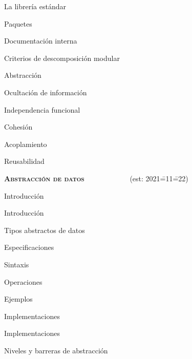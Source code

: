 \begin{longenum}
\begin{longenum}
\begin{longenum}
            \item La librería estándar
            \item Paquetes \opcional\
            \item Documentación interna \opcional\
        \end{longenum}
        \item Criterios de descomposición modular
        \begin{longenum}
            \item Abstracción
            \item Ocultación de información
            \item Independencia funcional
            \begin{longenum}
                \item Cohesión
                \item Acoplamiento
            \end{longenum}
            \item Reusabilidad
        \end{longenum}
    \end{longenum}
    \item \textbf{\textsc{Abstracción de datos}} \ \ \ \ \ \ \ \ \ \ \ \ (est: 2021\==11\==22)
    \begin{longenum}
        \item Introducción
        \begin{longenum}
            \item Introducción
            \item Tipos abstractos de datos
        \end{longenum}
        \item Especificaciones
        \begin{longenum}
            \item Sintaxis
            \item Operaciones
            \item Ejemplos
        \end{longenum}
        \item Implementaciones
        \begin{longenum}
            \item Implementaciones
        \end{longenum}
        \item Niveles y barreras de abstracción
        \begin{longenum}

\end{longenum}
\end{longenum}
\end{longenum}
